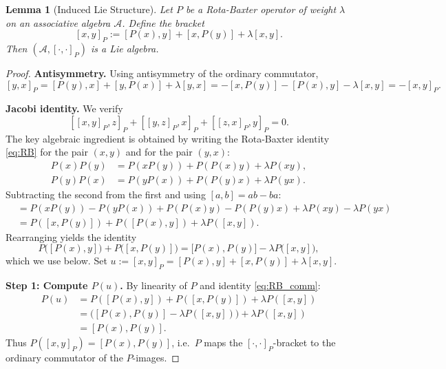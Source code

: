 \documentclass[10pt,a4paper]{amsart}
\newtheorem{lemma}{Lemma}
\newcommand{\Ac}{\mathcal{A}}
\begin{document}
\begin{lemma}[Induced Lie Structure]\label{lem:lie}
Let \(P\) be a Rota-Baxter operator of weight \(\lambda\) on an associative algebra
\(\Ac\). Define the bracket
\begin{equation}\label{eq:bracket}
[x,y]_P := [P(x), y] + [x, P(y)] + \lambda [x,y].
\end{equation}
Then \((\Ac, [\cdot,\cdot]_P)\) is a Lie algebra.
\end{lemma}

\begin{proof}
\textbf{Antisymmetry.} Using antisymmetry of the ordinary commutator,
\[
[y,x]_P = [P(y),x]+[y,P(x)]+\lambda[y,x]
         = -[x,P(y)]-[P(x),y]-\lambda[x,y]
         = -[x,y]_P.
\]

\textbf{Jacobi identity.} We verify
\[
[[x,y]_P,z]_P + [[y,z]_P,x]_P + [[z,x]_P,y]_P = 0.
\]
The key algebraic ingredient is obtained by writing the Rota-Baxter identity
\eqref{eq:RB} for the pair $(x,y)$ and for the pair $(y,x)$:
\begin{align*}
P(x)P(y) &= P(xP(y)) + P(P(x)y) + \lambda P(xy),\\
P(y)P(x) &= P(yP(x)) + P(P(y)x) + \lambda P(yx).
\end{align*}
Subtracting the second from the first and using $[a,b] = ab - ba$:
\begin{align*}
[P(x),P(y)]
  &= P(xP(y)) - P(yP(x)) + P(P(x)y) - P(P(y)x)
     + \lambda P(xy) - \lambda P(yx)\\
  &= P([x,P(y)]) + P([P(x),y]) + \lambda P([x,y]).
\end{align*}
Rearranging yields the identity
\begin{equation}\label{eq:RB_comm}
P\bigl([P(x),y]\bigr) + P\bigl([x,P(y)]\bigr)
  = \bigl[P(x),P(y)\bigr] - \lambda P\bigl([x,y]\bigr),
\end{equation}
which we use below. Set $u := [x,y]_P = [P(x),y]+[x,P(y)]+\lambda[x,y]$.

\textbf{Step 1: Compute $P(u)$.}
By linearity of $P$ and identity \eqref{eq:RB_comm}:
\begin{align*}
P(u)
  &= P([P(x),y]) + P([x,P(y)]) + \lambda P([x,y]) \\
  &= \bigl([P(x),P(y)] - \lambda P([x,y])\bigr) + \lambda P([x,y]) \\
  &= [P(x),P(y)].
\end{align*}
Thus $P([x,y]_P) = [P(x),P(y)]$, i.e.\ $P$ maps the $[\cdot,\cdot]_P$-bracket to the
ordinary commutator of the $P$-images.


\end{proof}
\end{document}
